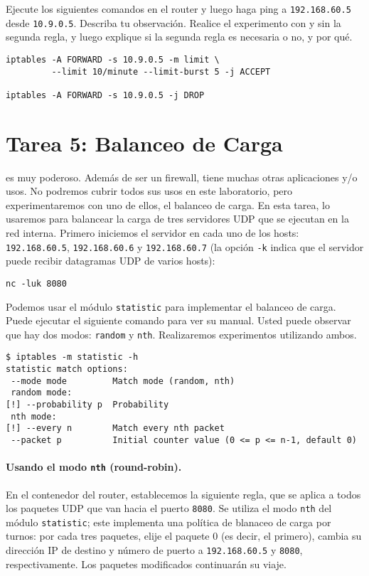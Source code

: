 Ejecute los siguientes comandos en el router y luego haga
ping a \texttt {192.168.60.5} desde \texttt{10.9.0.5}.
Describa tu observación.
Realice el experimento con y sin la segunda regla,
y luego explique si la segunda regla es necesaria o no, y por qué.


\begin{lstlisting}
iptables -A FORWARD -s 10.9.0.5 -m limit \
         --limit 10/minute --limit-burst 5 -j ACCEPT

iptables -A FORWARD -s 10.9.0.5 -j DROP
\end{lstlisting}



\section{Tarea 5: Balanceo de Carga}

\iptables es muy poderoso. Además de ser un firewall,
tiene muchas otras aplicaciones y/o usos. No podremos
cubrir todos sus usos en este laboratorio, pero experimentaremos
con uno de ellos, el balanceo de carga. En esta tarea,
lo usaremos para balancear la carga de tres servidores UDP que se ejecutan en la
red interna. Primero iniciemos el servidor
en cada uno de los hosts: \texttt {192.168.60.5}, \texttt {192.168.60.6} y
\texttt {192.168.60.7} (la opción \texttt {-k} indica que
el servidor puede recibir datagramas UDP de varios hosts):


\begin{lstlisting}
nc -luk 8080
\end{lstlisting}

Podemos usar el módulo \texttt{statistic} para implementar el balanceo de carga.
Puede ejecutar el siguiente comando para ver su manual. Usted puede
observar que hay dos modos: \texttt{random} y \texttt{nth}.
Realizaremos experimentos utilizando ambos.


\begin{lstlisting}
$ iptables -m statistic -h 
statistic match options:
 --mode mode         Match mode (random, nth)
 random mode:
[!] --probability p  Probability
 nth mode:
[!] --every n        Match every nth packet
 --packet p          Initial counter value (0 <= p <= n-1, default 0)
\end{lstlisting}
 

\paragraph{Usando el modo \texttt{nth} (round-robin).}
En el contenedor del router, establecemos la siguiente regla, que se aplica
a todos los paquetes UDP que van hacia el puerto \texttt{8080}.
Se utiliza el modo \texttt {nth} del módulo \texttt{statistic};
este implementa una política de blanaceo de carga por turnos: por cada
tres paquetes, elije el paquete 0 (es decir, el primero),
cambia su dirección IP de destino y número de puerto a
\texttt{192.168.60.5} y \texttt{8080}, respectivamente.
Los paquetes modificados continuarán su viaje.



